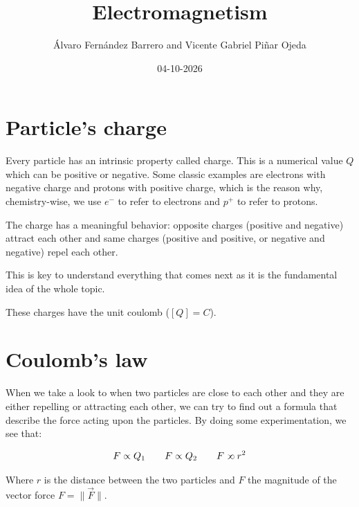 \documentclass[12pt]{article}
\author{Álvaro Fernández Barrero and Vicente Gabriel Piñar Ojeda}
\title{Electromagnetism}
\date{04-10-2026}
\newcommand{\proptoinverse}{\mathrel{\mskip1mu\reflectbox{$\propto$}\mskip-1mu}}
\begin{document}
	\maketitle
	
	
	\section{Particle's charge}
	
	Every particle has an intrinsic property called charge. This is a numerical value $Q$ which can be positive or negative. Some classic examples are electrons with negative charge and protons with positive charge, which is the reason why, chemistry-wise, we use $e^-$ to refer to electrons and $p^+$ to refer to protons.
	
	The charge has a meaningful behavior: opposite charges (positive and negative) attract each other and same charges (positive and positive, or negative and negative) repel each other.
	
	This is key to understand everything that comes next as it is the fundamental idea of the whole topic.
	
	These charges have the unit coulomb ($[Q] = C$).
	
	
	\section{Coulomb's law}
	
	When we take a look to when two particles are close to each other and they are either repelling or attracting each other, we can try to find out a formula that describe the force acting upon the particles. By doing some experimentation, we see that:
	
	\[
		F \propto Q_1 \quad\quad F \propto Q_2 \quad\quad F \proptoinverse r^2
	\]
	
	Where $r$ is the distance between the two particles and $F$ the magnitude of the vector force $F = \|\vec{F}\|$.
	
\end{document}
